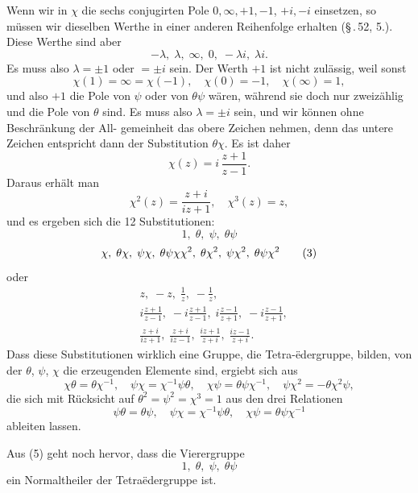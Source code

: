 \documentclass[12pt,a4paper]{article}
\theoremstyle{plain}
\theoremstyle{definition}
\theoremstyle{remark}
\begin{document}
Wenn wir in $\chi$ die sechs conjugirten Pole $0, \infty, +1, -1$,
$+i, -i$ einsetzen, so m\"ussen wir dieselben Werthe in einer
anderen Reihenfolge erhalten (\S\,.\,52, 5.). Diese Werthe sind aber
\[
-\lambda,\; \lambda,\; \infty,\; 0,\; -\lambda i,\; \lambda i.
\]
Es muss also $\lambda = \pm 1$ oder $= \pm i$ sein. Der Werth $+1$
ist nicht zul\"assig, weil sonst
\[
\chi(1) = \infty = \chi(-1),\quad \chi(0) = -1,\quad \chi(\infty) = 1,
\]
und also $+1$ die Pole von $\psi$ oder von $\theta\psi$ w\"aren, w\"ahrend sie
doch nur zweiz\"ahlig und die Pole von $\theta$ sind. Es muss also
$\lambda = \pm i$ sein, und wir k\"onnen ohne Beschr\"ankung der All-
gemeinheit das obere Zeichen nehmen, denn das untere Zeichen
entspricht dann der Substitution $\theta\chi$. Es ist daher
\[
\chi(z) = i\,\frac{z+1}{z-1}.
\]
Daraus erh\"alt man
\[
\chi^2(z) = \frac{z+i}{iz+1},\quad \chi^3(z) = z,
\]
und es ergeben sich die 12 Substitutionen:
\[
1,\; \theta,\; \psi,\; \theta\psi
\]
\begin{equation}\label{eq:56_3}
\chi,\; \theta\chi,\; \psi\chi,\; \theta\psi\chi\\
\chi^2,\; \theta\chi^2,\; \psi\chi^2,\; \theta\psi\chi^2\tag{3}
\end{equation}
oder
\begin{equation}\label{eq:56_4}
\begin{aligned}
&z,\; -z,\; \frac{1}{z},\; -\frac{1}{z},\\
&i\frac{z+1}{z-1},\; -i\frac{z+1}{z-1},\; i\frac{z-1}{z+1},\; -i\frac{z-1}{z+1},\\
&\frac{z+i}{iz+1},\; \frac{z+i}{iz-1},\; \frac{iz+1}{z+i},\; \frac{iz-1}{z+i}.\end{aligned}\tag{4}
\end{equation}
Dass diese Substitutionen wirklich eine Gruppe, die Tetra-\"edergruppe, bilden, von der $\theta$, $\psi$, $\chi$ die erzeugenden Elemente
sind, ergiebt sich aus
\begin{equation}\label{eq:56_5}
\chi\theta = \theta\chi^{-1},\quad \psi\chi = \chi^{-1}\psi\theta,\quad \chi\psi = \theta\psi\chi^{-1},\quad \psi\chi^2 = -\theta\chi^2\psi,\tag{5}
\end{equation}
die sich mit R\"ucksicht auf $\theta^2 = \psi^2 = \chi^3 = 1$ aus den drei
Relationen
\[
\psi\theta = \theta\psi,\quad \psi\chi = \chi^{-1}\psi\theta,\quad \chi\psi = \theta\psi\chi^{-1}
\]
ableiten lassen.

Aus (5) geht noch hervor, dass die Vierergruppe
\begin{equation}\label{eq:56_6}
1,\; \theta,\; \psi,\; \theta\psi\tag{6}
\end{equation}
ein Normaltheiler der Tetra\"edergruppe ist.
\end{document}
